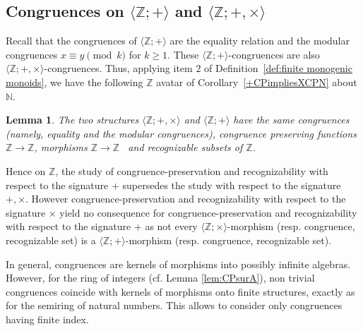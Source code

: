 \documentclass[11pt,a4paper]{article}
\newtheorem{lemma}[theorem]{Lemma}
\theoremstyle{definition} %
\newcommand\+[1]{\mathcal{#1}} %
\newcommand{\N}{{\mathbb N}}     %
\newcommand{\Z}{{\mathbb Z}}     %
\begin{document}
\subsection{Congruences on $\langle\Z;+\rangle$ and $\langle\Z;+,\times\rangle$}\label{ss cong Z+}

Recall that the congruences of $\langle\Z;+\rangle$ are the equality relation and the modular
congruences $x\equiv y\pmod k$ for $k\geq1$.
These $\langle\Z;+\rangle$-congruences are also $\langle\Z;+,\times\rangle$-congruences.
Thus, applying item 2 of Definition~\ref{def:finite monogenic monoids},
we have the following $\Z$ avatar of Corollary~\ref{+CPimpliesXCPN} about $\N$.

\begin{lemma}\label{+CPimpliesXCP} 
The two structures 
$\langle \Z;+,\times\rangle$ and $\langle \Z;+\rangle$
have the same congruences (namely, equality and the modular congruences),
congruence preserving functions $\Z\to \Z$, morphisms $\Z\to\Z$ \
and recognizable subsets of $\Z$.
\end{lemma}
%
Hence on  $\Z$, the study of congruence-preservation and recognizability with respect to  the signature + supersedes the study with respect to the signature $+,\times$. However congruence-preservation and recognizability with respect to  the signature $\times$ yield no consequence for congruence-preservation and recognizability with respect to  the signature +
as  not every $\langle  \Z ;\times\rangle$-morphism (resp.\! congruence, recognizable set) is a $\langle  \Z ;+\rangle$-morphism (resp.\! congruence, recognizable set).

In general, congruences are kernels of morphisms into possibly infinite algebras.
However, for the ring of integers (cf.\! Lemma \ref{lem:CPsurA}), 
non trivial congruences coincide with kernels of  morphisms onto finite structures, 
exactly as for  the semiring of natural numbers.
This allows to consider only congruences having finite index.

\end{document}
